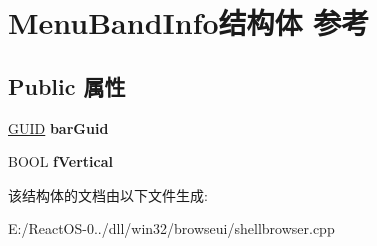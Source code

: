 \hypertarget{struct_menu_band_info}{}\section{Menu\+Band\+Info结构体 参考}
\label{struct_menu_band_info}
\subsection*{Public 属性}
\begin{DoxyCompactItemize}
\item 
\mbox{\label{struct_menu_band_info_a6550905fe7468b3519bf71387f8e3361}} 
\hyperlink{interface_g_u_i_d}{G\+U\+ID} {\bfseries bar\+Guid}
\item 
\mbox{\label{struct_menu_band_info_ad78e5b58f8738585351b534d45d05940}} 
B\+O\+OL {\bfseries f\+Vertical}
\end{DoxyCompactItemize}


该结构体的文档由以下文件生成\+:\begin{DoxyCompactItemize}
\item 
E\+:/\+React\+O\+S-\/0../dll/win32/browseui/shellbrowser.\+cpp\end{DoxyCompactItemize}
